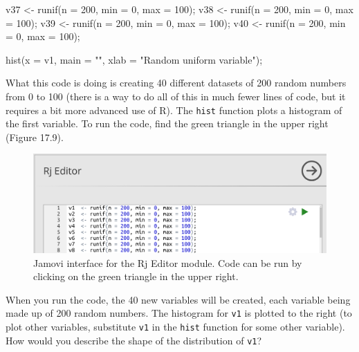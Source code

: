 \documentclass[
]{scrbook}
\newenvironment{Shaded}{\begin{snugshade}}{\end{snugshade}}
\newcommand{\AttributeTok}[1]{\textcolor[rgb]{0.77,0.63,0.00}{#1}}
\newcommand{\DecValTok}[1]{\textcolor[rgb]{0.00,0.00,0.81}{#1}}
\newcommand{\FunctionTok}[1]{\textcolor[rgb]{0.00,0.00,0.00}{#1}}
\newcommand{\NormalTok}[1]{#1}
\newcommand{\OtherTok}[1]{\textcolor[rgb]{0.56,0.35,0.01}{#1}}
\newcommand{\StringTok}[1]{\textcolor[rgb]{0.31,0.60,0.02}{#1}}
\begin{document}
\begin{Shaded}
\begin{Highlighting}[]
\NormalTok{v37 }\OtherTok{\textless{}{-}} \FunctionTok{runif}\NormalTok{(}\AttributeTok{n =} \DecValTok{200}\NormalTok{, }\AttributeTok{min =} \DecValTok{0}\NormalTok{, }\AttributeTok{max =} \DecValTok{100}\NormalTok{);}
\NormalTok{v38 }\OtherTok{\textless{}{-}} \FunctionTok{runif}\NormalTok{(}\AttributeTok{n =} \DecValTok{200}\NormalTok{, }\AttributeTok{min =} \DecValTok{0}\NormalTok{, }\AttributeTok{max =} \DecValTok{100}\NormalTok{);}
\NormalTok{v39 }\OtherTok{\textless{}{-}} \FunctionTok{runif}\NormalTok{(}\AttributeTok{n =} \DecValTok{200}\NormalTok{, }\AttributeTok{min =} \DecValTok{0}\NormalTok{, }\AttributeTok{max =} \DecValTok{100}\NormalTok{);}
\NormalTok{v40 }\OtherTok{\textless{}{-}} \FunctionTok{runif}\NormalTok{(}\AttributeTok{n =} \DecValTok{200}\NormalTok{, }\AttributeTok{min =} \DecValTok{0}\NormalTok{, }\AttributeTok{max =} \DecValTok{100}\NormalTok{);}

\FunctionTok{hist}\NormalTok{(}\AttributeTok{x =}\NormalTok{ v1, }\AttributeTok{main =} \StringTok{""}\NormalTok{, }\AttributeTok{xlab =} \StringTok{"Random uniform variable"}\NormalTok{);}
\end{Highlighting}
\end{Shaded}

What this code is doing is creating 40 different datasets of 200 random numbers from 0 to 100 (there is a way to do all of this in much fewer lines of code, but it requires a bit more advanced use of R).
The \texttt{hist} function plots a histogram of the first variable.
To run the code, find the green triangle in the upper right (Figure 17.9).

\begin{figure}
\includegraphics[width=0.8\linewidth]{img/jamovi_RjEditor} \caption{Jamovi interface for the Rj Editor module. Code can be run by clicking on the green triangle in the upper right.}\label{fig:unnamed-chunk-80}
\end{figure}

When you run the code, the 40 new variables will be created, each variable being made up of 200 random numbers.
The histogram for \texttt{v1} is plotted to the right (to plot other variables, substitute \texttt{v1} in the \texttt{hist} function for some other variable).
How would you describe the shape of the distribution of \texttt{v1}?
\end{document}
